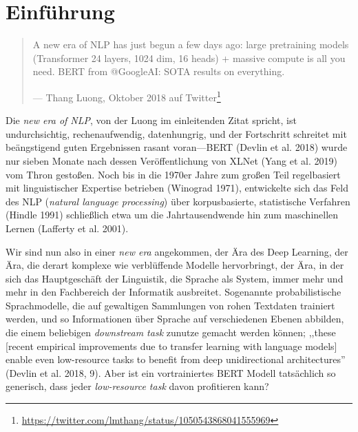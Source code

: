 \chapter{Einführung}
\label{einfuehrung}
\begin{quote}
  A new era of NLP has just begun a few days ago: large pretraining models (Transformer 24 layers, 1024 dim, 16 heads) + massive compute is all you need. BERT from @GoogleAI: SOTA results on everything.
\begin{flushright}--- Thang Luong, Oktober 2018 auf Twitter\footnote{\url{https://twitter.com/lmthang/status/1050543868041555969}}\end{flushright}
\end{quote}

\vspace{0.4cm}

\noindent Die \textit{new era of NLP}, von der Luong im einleitenden Zitat spricht, ist undurchsichtig, rechenaufwendig, datenhungrig, und der Fortschritt schreitet mit beängstigend guten Ergebnissen rasant voran---BERT (Devlin et al. 2018) wurde nur sieben Monate nach dessen Veröffentlichung von XLNet (Yang et al. 2019) vom Thron gestoßen. Noch bis in die 1970er Jahre zum großen Teil regelbasiert mit linguistischer Expertise betrieben (Winograd 1971), entwickelte sich das Feld des NLP (\textit{natural language processing}) über korpusbasierte, statistische Verfahren (Hindle 1991) schließlich etwa um die Jahrtausendwende hin zum maschinellen Lernen (Lafferty et al. 2001).

Wir sind nun also in einer \textit{new era} angekommen, der Ära des Deep Learning, der Ära, die derart komplexe wie verblüffende Modelle hervorbringt, der Ära, in der sich das Hauptgeschäft der Linguistik, die Sprache als System, immer mehr und mehr in den Fachbereich der Informatik ausbreitet. Sogenannte probabilistische Sprachmodelle, die auf gewaltigen Sammlungen von rohen Textdaten trainiert werden, und so Informationen über Sprache auf verschiedenen Ebenen abbilden, die einem beliebigen \textit{downstream task} zunutze gemacht werden können; ,,these [recent empirical improvements due to transfer learning with language models] enable even low-resource tasks to benefit from deep unidirectional architectures'' (Devlin et al. 2018, 9). Aber ist ein vortrainiertes BERT Modell tatsächlich so generisch, dass jeder \textit{low-resource task} davon profitieren kann?

